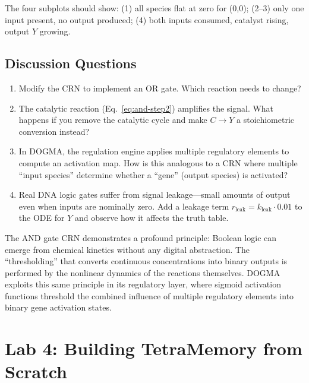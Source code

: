 The four subplots should show: (1) all species flat at zero for (0,0); (2--3) only one input present, no output produced; (4) both inputs consumed, catalyst rising, output $Y$ growing.

\subsection{Discussion Questions}

\begin{enumerate}[leftmargin=1.8em]
  \item Modify the CRN to implement an OR gate. Which reaction needs to change?
  \item The catalytic reaction (Eq.~\ref{eq:and-step2}) amplifies the signal. What happens if you remove the catalytic cycle and make $C \to Y$ a stoichiometric conversion instead?
  \item In DOGMA, the regulation engine applies multiple regulatory elements to compute an activation map. How is this analogous to a CRN where multiple ``input species'' determine whether a ``gene'' (output species) is activated?
  \item Real DNA logic gates suffer from signal leakage---small amounts of output even when inputs are nominally zero. Add a leakage term $r_{\text{leak}} = k_{\text{leak}} \cdot 0.01$ to the ODE for $Y$ and observe how it affects the truth table.
\end{enumerate}

\begin{bioinsight}
The AND gate CRN demonstrates a profound principle: Boolean logic can emerge from chemical kinetics without any digital abstraction. The ``thresholding'' that converts continuous concentrations into binary outputs is performed by the nonlinear dynamics of the reactions themselves. DOGMA exploits this same principle in its regulatory layer, where sigmoid activation functions threshold the combined influence of multiple regulatory elements into binary gene activation states.
\end{bioinsight}


\section{Lab 4: Building TetraMemory from Scratch}
\label{sec:lab4-tetra-memory}


